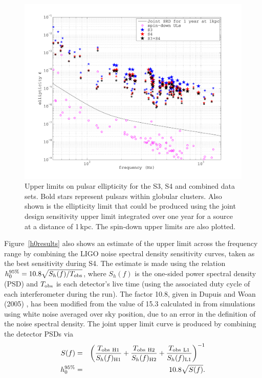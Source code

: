 \begin{figure}[!htbp]
\begin{center}
\includegraphics[width=1.0\textwidth]{figs/upperlimitsEll}\caption[Upper limits on pulsar
ellipticity for the S3, S4 and combined data sets.]{Upper limits on pulsar ellipticity for the S3,
S4 and combined data sets. Bold stars represent pulsars within globular clusters. Also shown is the
ellipticity limit that could be produced using the joint design sensitivity upper limit integrated
over one year for a source at a distance of 1\,kpc. The spin-down upper limits are also
plotted.}\label{ellresults}
\end{center}
\end{figure}
Figure~\ref{h0results} also shows an estimate of the upper limit across the frequency range by
combining the LIGO noise spectral density sensitivity curves, taken as the best sensitivity during
S4. The estimate is made using the relation $h_0^{95\%} = 10.8\sqrt{S_h(f)/T_{\rm obs}}$, where
$S_h(f)$ is the one-sided power spectral density (PSD) and $T_{\rm obs}$ is each detector's live
time (using the associated duty cycle of each interferometer during the run). The factor 10.8, given
in Dupuis and Woan (2005) \cite{DupuisWoan:2005}, has been modified from the value of 15.3
calculated in \cite{Dupuis:2004} from simulations using white noise averaged over sky position, due
to an error in the definition of the noise spectral density. The joint upper limit curve is produced
by combining the detector PSDs via
\begin{eqnarray}
S(f) & = & \left(\frac{T_{\rm obs~H1}}{S_h(f)_{\rm H1}} + \frac{T_{\rm obs~H2}}{S_h(f)_{\rm
H2}} + \frac{T_{\rm obs~L1}}{S_h(f)_{\rm L1}} \right)^{-1} \\ \nonumber
h_0^{95\%} & = & 10.8\sqrt{S(f)}.
\end{eqnarray} 
